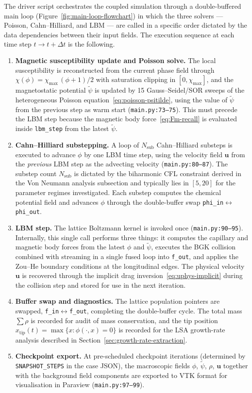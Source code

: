 The driver script orchestrates the coupled simulation through a double-buffered main loop (Figure~\ref{fig:main-loop-flowchart}) in which the three solvers --- Poisson, Cahn--Hilliard, and LBM --- are called in a specific order dictated by the data dependencies between their input fields.
The execution sequence at each time step $t \to t + \Delta t$ is the following.
\begin{enumerate}
\item \textbf{Magnetic susceptibility update and Poisson solve.}
The local susceptibility is reconstructed from the current phase field through $\chi(\phi) = \chi_{\max}\,(\phi + 1)/2$ with saturation clipping in $[0, \chi_{\max}]$, and the magnetostatic potential $\tilde{\psi}$ is updated by 15 Gauss--Seidel/SOR sweeps of the heterogeneous Poisson equation~\eqref{eq:poisson-psitilde}, using the value of $\tilde{\psi}$ from the previous step as warm start (\texttt{main.py:73--75}).
This must precede the LBM step because the magnetic body force~\eqref{eq:Fm-recall} is evaluated inside \texttt{lbm\_step} from the latest $\tilde{\psi}$.
\item \textbf{Cahn--Hilliard substepping.}
A loop of $N_{\mathrm{sub}}$ Cahn--Hilliard substeps is executed to advance $\phi$ by one LBM time step, using the velocity field $\bm{u}$ from the \emph{previous} LBM step as the advecting velocity (\texttt{main.py:80--87}).
The substep count $N_{\mathrm{sub}}$ is dictated by the biharmonic CFL constraint derived in the Von Neumann analysis subsection and typically lies in $[5, 20]$ for the parameter regimes investigated.
Each substep computes the chemical potential field and advances $\phi$ through the double-buffer swap \texttt{phi\_in}$\leftrightarrow$\texttt{phi\_out}.
\item \textbf{LBM step.}
The lattice Boltzmann kernel is invoked once (\texttt{main.py:90--95}).
Internally, this single call performs three things: it computes the capillary and magnetic body forces from the latest $\phi$ and $\tilde{\psi}$, executes the BGK collision combined with streaming in a single fused loop into \texttt{f\_out}, and applies the Zou--He boundary conditions at the longitudinal edges.
The physical velocity $\bm{u}$ is recovered through the implicit drag inversion~\eqref{eq:uphys-implicit} during the collision step and stored for use in the next iteration.
\item \textbf{Buffer swap and diagnostics.}
The lattice population pointers are swapped, \texttt{f\_in}$\leftrightarrow$\texttt{f\_out}, completing the double-buffer cycle.
The total mass $\sum\rho$ is recorded for audit of mass conservation, and the tip position $x_{\mathrm{tip}}(t) = \max\{x : \phi(\cdot, x) = 0\}$ is recorded for the LSA growth-rate analysis described in Section~\ref{sec:growth-rate-extraction}.
\item \textbf{Checkpoint export.}
At pre-scheduled checkpoint iterations (determined by \texttt{SNAPSHOT\_STEPS} in the case JSON), the macroscopic fields $\phi$, $\tilde{\psi}$, $\rho$, $\bm{u}$ together with the background field components are exported to VTK format for visualisation in Paraview (\texttt{main.py:97--99}).
\end{enumerate}

